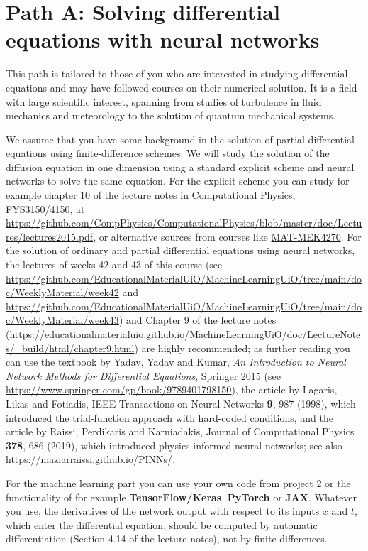 \documentclass[11pt,a4paper]{article}
\newcommand{\lnotes}[1]{\url{https://educationalmaterialuio.github.io/MachineLearningUiO/doc/LectureNotes/_build/html/#1.html}}
\newcommand{\weekly}[1]{\url{https://github.com/EducationalMaterialUiO/MachineLearningUiO/tree/main/doc/WeeklyMaterial/#1}}
\begin{document}
\section*{Path A: Solving differential equations with neural networks}

This path is tailored to those of you who are interested in studying
differential equations and may have followed courses on their numerical
solution.  It is a field with large scientific interest, spanning from
studies of turbulence in fluid mechanics and meteorology to the solution of
quantum mechanical systems.

We assume that you have some background in the solution of partial
differential equations using finite-difference schemes.  We will study the
solution of the diffusion equation in one dimension using a standard explicit
scheme and neural networks to solve the same equation.  For the explicit
scheme you can study for example chapter 10 of the lecture notes in
Computational Physics, FYS3150/4150, at
\url{https://github.com/CompPhysics/ComputationalPhysics/blob/master/doc/Lectures/lectures2015.pdf},
or alternative sources from courses like
\href{https://www.uio.no/studier/emner/matnat/math/MAT-MEK4270/index.html}{MAT-MEK4270}.
For the solution of ordinary and partial differential equations using neural
networks, the lectures of weeks 42 and 43 of this course (see
\weekly{week42} and \weekly{week43}) and Chapter 9 of the lecture notes
(\lnotes{chapter9}) are highly recommended; as further reading you can use
the textbook by Yadav, Yadav and Kumar, \emph{An Introduction to Neural
Network Methods for Differential Equations}, Springer 2015 (see
\url{https://www.springer.com/gp/book/9789401798150}), the article by Lagaris,
Likas and Fotiadis, IEEE Transactions on Neural Networks \textbf{9}, 987
(1998), which introduced the trial-function approach with hard-coded
conditions, and the article by Raissi, Perdikaris and Karniadakis, Journal of
Computational Physics \textbf{378}, 686 (2019), which introduced
physics-informed neural networks; see also
\url{https://maziarraissi.github.io/PINNs/}.

For the machine learning part you can use your own code from project 2 or
the functionality of for example \textbf{TensorFlow/Keras}, \textbf{PyTorch}
or \textbf{JAX}.  Whatever you use, the derivatives of the network output
with respect to its inputs $x$ and $t$, which enter the differential
equation, should be computed by automatic differentiation (Section 4.14 of
the lecture notes), not by finite differences.
\end{document}
